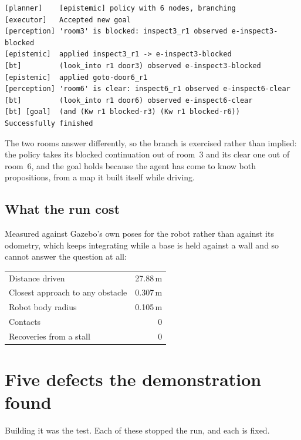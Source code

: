 \documentclass[11pt,a4paper]{article}
\theoremstyle{definition}
\begin{document}
\begin{lstlisting}
[planner]    [epistemic] policy with 6 nodes, branching
[executor]   Accepted new goal
[perception] 'room3' is blocked: inspect3_r1 observed e-inspect3-blocked
[epistemic]  applied inspect3_r1 -> e-inspect3-blocked
[bt]         (look_into r1 door3) observed e-inspect3-blocked
[epistemic]  applied goto-door6_r1
[perception] 'room6' is clear: inspect6_r1 observed e-inspect6-clear
[bt]         (look_into r1 door6) observed e-inspect6-clear
[bt] [goal]  (and (Kw r1 blocked-r3) (Kw r1 blocked-r6))
Successfully finished
\end{lstlisting}

The two rooms answer differently, so the branch is exercised rather than
implied: the policy takes its blocked continuation out of room~3 and its clear
one out of room~6, and the goal holds because the agent has come to know both
propositions, from a map it built itself while driving.

\subsection{What the run cost}

Measured against Gazebo's own poses for the robot rather than against its
odometry, which keeps integrating while a base is held against a wall and so
cannot answer the question at all:

\begin{center}
\begin{tabular}{@{}lr@{}}
\toprule
Distance driven & 27.88\,m \\
Closest approach to any obstacle & 0.307\,m \\
Robot body radius & 0.105\,m \\
Contacts & 0 \\
Recoveries from a stall & 0 \\
\bottomrule
\end{tabular}
\end{center}

\section{Five defects the demonstration found}

Building it was the test. Each of these stopped the run, and each is fixed.
\end{document}
